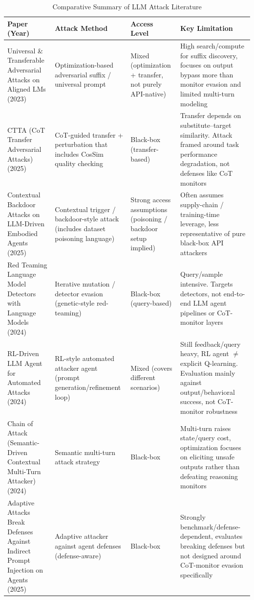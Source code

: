 \documentclass[conference]{IEEEtran}
\begin{document}
\begin{table}[!t]
\caption{Comparative Summary of LLM Attack Literature}
\label{tab:offensive-literature}
\centering
{\scriptsize
\setlength{\tabcolsep}{3pt}
\renewcommand{\arraystretch}{1.1}
\begin{tabular}{|L{3.8cm}|L{3.6cm}|L{2.6cm}|L{6.3cm}|}
\hline
\textbf{Paper (Year)} & \textbf{Attack Method} & \textbf{Access Level} & \textbf{Key Limitation} \\
\hline
\cite{b10} Universal \& Transferable Adversarial Attacks on Aligned LMs (2023) & Optimization-based adversarial suffix / universal prompt & Mixed (optimization + transfer, not purely API-native) & High search/compute for suffix discovery, focuses on output bypass more than monitor evasion and limited multi-turn modeling \\
\hline
\cite{b11} CTTA (CoT Transfer Adversarial Attacks) (2025) & CoT-guided transfer + perturbation that includes CosSim quality checking & Black-box (transfer-based) & Transfer depends on substitute--target similarity. Attack framed around task performance degradation, not defenses like CoT monitors \\
\hline
\cite{b12} Contextual Backdoor Attacks on LLM-Driven Embodied Agents (2025) & Contextual trigger / backdoor-style attack (includes dataset poisoning language) & Strong access assumptions (poisoning / backdoor setup implied) & Often assumes supply-chain / training-time leverage, less representative of pure black-box API attackers \\
\hline
\cite{b13} Red Teaming Language Model Detectors with Language Models (2024) & Iterative mutation / detector evasion (genetic-style red-teaming) & Black-box (query-based) & Query/sample intensive. Targets detectors, not end-to-end LLM agent pipelines or CoT-monitor layers \\
\hline
\cite{b14} RL-Driven LLM Agent for Automated Attacks (2024) & RL-style automated attacker agent (prompt generation/refinement loop) & Mixed (covers different scenarios) & Still feedback/query heavy, RL agent $\neq$ explicit Q-learning. Evaluation mainly against output/behavioral success, not CoT-monitor robustness \\
\hline
\cite{b15} Chain of Attack (Semantic-Driven Contextual Multi-Turn Attacker) (2024) & Semantic multi-turn attack strategy & Black-box & Multi-turn raises state/query cost, optimization focuses on eliciting unsafe outputs rather than defeating reasoning monitors \\
\hline
\cite{b16} Adaptive Attacks Break Defenses Against Indirect Prompt Injection on Agents (2025) & Adaptive attacker against agent defenses (defense-aware) & Black-box & Strongly benchmark/defense-dependent, evaluates breaking defenses but not designed around CoT-monitor evasion specifically \\
\hline
\end{tabular}
}
\end{table}
\end{document}
